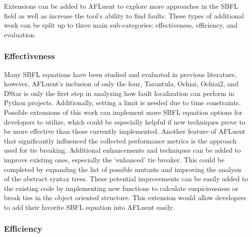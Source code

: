 Extensions can be added to AFLuent to explore more approaches in the
SBFL field as well as increase the tool's ability to find faults. These
types of additional work can be split up to three main sub-categories:
effectiveness, efficiency, and evaluation.

\subsubsection{Effectiveness}

Many SBFL equations have been studied and evaluated in previous literature,
however, AFLuent's inclusion of only the four, Tarantula, Ochiai, Ochiai2, and
DStar is only the first step in analyzing how fault localization can perform in
Python projects. Additionally, setting a limit is needed due to time
constraints. Possible extensions of this work can implement more SBFL equation
options for developers to utilize, which could be especially helpful if new
techniques prove to be more effective than those currently implemented. Another
feature of AFLuent that significantly influenced the collected performance
metrics is the approach used for tie breaking. Additional enhancements and
techniques can be added to improve existing ones, especially the `enhanced' tie
breaker. This could be completed by expanding the list of possible mutants and
improving the analysis of the abstract syntax trees. These potential improvements
can be easily added to the existing code by implementing new functions to calculate suspiciousness
or break ties in the object oriented structure. This extension would allow developers
to add their favorite SBFL equation into AFLuent easily.

\subsubsection{Efficiency}

